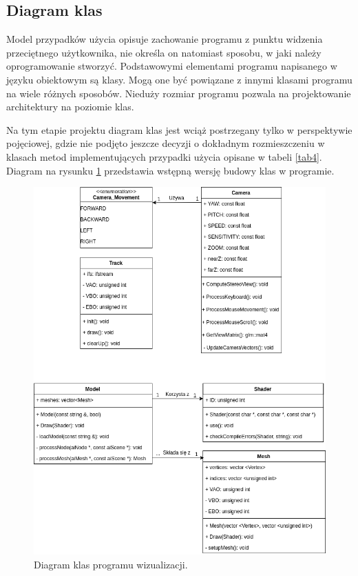 \subsection{Diagram klas}
Model przypadków użycia opisuje zachowanie programu z punktu widzenia przeciętnego użytkownika, nie określa on natomiast sposobu, w jaki
należy oprogramowanie stworzyć. Podstawowymi elementami programu napisanego w języku obiektowym są klasy. Mogą one być powiązane z innymi klasami programu na wiele różnych sposobów. Nieduży rozmiar programu pozwala na projektowanie architektury na poziomie klas.

Na tym etapie projektu diagram klas jest wciąż postrzegany tylko w perspektywie pojęciowej, gdzie nie podjęto jeszcze decyzji o dokładnym rozmieszczeniu w klasach metod implementujących przypadki użycia opisane w tabeli \ref{tab4}. Diagram na rysunku \ref{rys24} przedstawia wstępną wersję budowy klas w programie.

\begin{figure}[H]
\centering
\includegraphics[width=13.0cm]{DiagramKlas.png}
\caption{Diagram klas programu wizualizacji.}
\label{rys24}
\end{figure}

